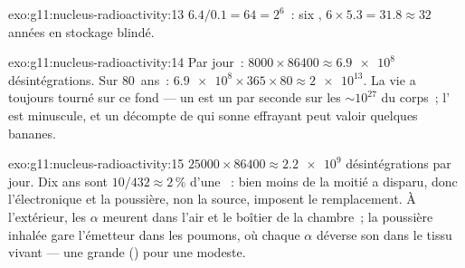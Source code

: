 \begin{solution}{exo:g11:nucleus-radioactivity:13}
$6.4/0.1 = 64 = 2^{6}$~: six , $6 \times 5.3 = 31.8 \approx 32$
années en stockage blindé.
\end{solution}

\begin{solution}{exo:g11:nucleus-radioactivity:14}
Par jour~: $8000 \times 86400 \approx \num{6.9e8}$ désintégrations. Sur
$80$~ans~: $\num{6.9e8} \times 365 \times 80 \approx \num{2e13}$. La vie
a toujours tourné sur ce fond --- un
 est un
 par seconde sur les
$\sim 10^{27}$ du corps~; l' est
minuscule, et un décompte de
 qui sonne effrayant peut
valoir quelques bananes.
\end{solution}

\begin{solution}{exo:g11:nucleus-radioactivity:15}
$\num{25000} \times 86400 \approx \num{2.2e9}$ désintégrations par jour.
Dix ans sont $10/432 \approx 2\,\%$ d'une
~: bien moins de la moitié a
disparu, donc l'électronique et la poussière, non la source,
imposent le remplacement. À l'extérieur, les
$\alpha$ meurent dans l'air et le boîtier de la chambre~; la poussière
inhalée gare l'émetteur dans les poumons, où chaque $\alpha$ déverse
son  dans le tissu vivant --- une
grande 
() pour une
 modeste.
\end{solution}


